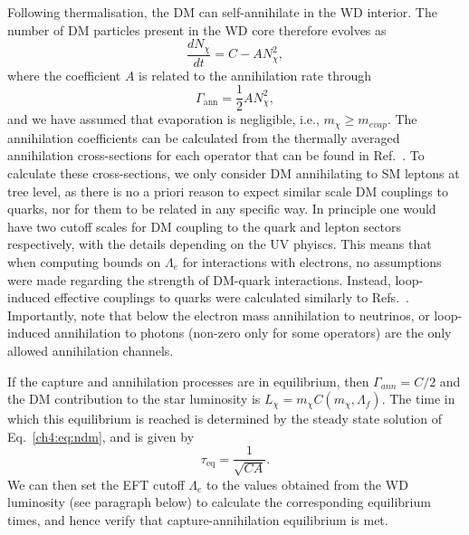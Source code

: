 Following thermalisation, the DM can self-annihilate in the WD interior.  The number of DM particles present in the WD core therefore evolves as
\begin{equation}
    \frac{dN_\chi}{dt} = C - A N_\chi^2, 
    \label{ch4:eq:ndm}
\end{equation}
where the coefficient $A$ is related to the annihilation rate through
\begin{equation}
 \Gamma_\mathrm{ann} =  \frac{1}{2}A N_\chi^2,   
\end{equation}
and we have assumed that evaporation is negligible, i.e., $m_\chi\geq m_{evap}$. 
The annihilation coefficients can be calculated from the thermally averaged annihilation cross-sections for each operator that can be found in Ref.~\cite{Zheng:2010js_Constraininginteractionstrength}.
To calculate these cross-sections, we only consider DM annihilating to SM leptons at tree level, as there is no a priori reason to expect similar scale DM couplings to quarks, nor for them to be related in any specific way. In principle one would have two cutoff scales for DM coupling to the quark and lepton sectors respectively, with the details depending on the UV phyiscs. 
This means that when computing bounds on $\Lambda_e$ for interactions with electrons, no assumptions were made regarding the strength of DM-quark interactions. 
Instead, loop-induced effective couplings to quarks were calculated similarly to Refs.~\cite{Kopp:2009et_DAMALIBRAleptonically,Bell:2019pyc_jun_CaptureLeptophilicDark}.  
Importantly, note that below the electron mass annihilation to neutrinos, or loop-induced annihilation to photons (non-zero only for some operators) are the only allowed annihilation channels. 

If the capture and annihilation processes are in equilibrium, then $\Gamma_{ann}=C/2$ and the DM contribution to the star luminosity is $L_\chi=m_\chi C(m_\chi,\Lambda_f)$. The time in which this equilibrium is reached is determined by the steady state solution of Eq.~\ref{ch4:eq:ndm}, and is given by
\begin{equation}
    \tau_\mathrm{eq} = \frac{1}{\sqrt{C A}}.\label{ch4:eq:taueq}
\end{equation}
We can then set the EFT cutoff $\Lambda_e$ to the values obtained from the WD luminosity (see paragraph below)  to calculate the corresponding equilibrium times, and hence verify that capture-annihilation equilibrium is met. 


